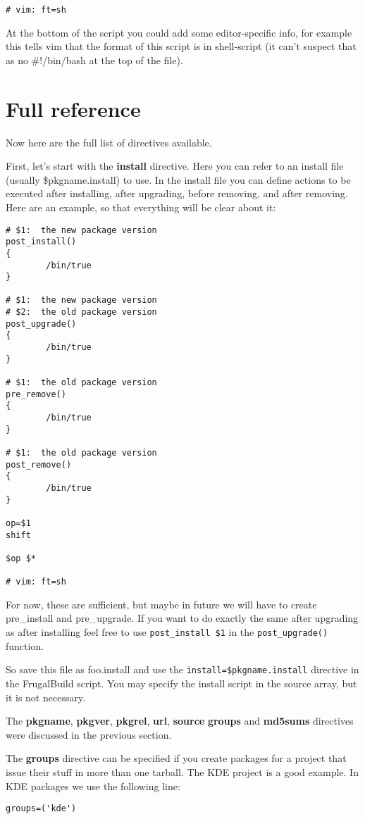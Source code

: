 \begin{verbatim}
# vim: ft=sh
\end{verbatim}

At the bottom of the script you could add some editor-specific info, for example this tells vim that the format of this script is in shell-script (it can't suspect that as no #!/bin/bash at the top of the file).

\section{Full reference}

Now here are the full list of directives available.

First, let's start with the \textbf{install} directive. Here you can refer to an install file (usually \$pkgname.install) to use. In the install file you can define actions to be executed after installing, after upgrading, before removing, and after removing. Here are an example, so that everything will be clear about it:

\begin{verbatim}
# $1:  the new package version
post_install()
{
        /bin/true
}

# $1:  the new package version
# $2:  the old package version
post_upgrade()
{
        /bin/true
}

# $1:  the old package version
pre_remove()
{
        /bin/true
}

# $1:  the old package version
post_remove()
{
        /bin/true
}

op=$1
shift

$op $*

# vim: ft=sh
\end{verbatim}

For now, these are sufficient, but maybe in future we will have to create pre\_install and pre\_upgrade. If you want to do exactly the same after upgrading as after installing feel free to use {\tt post\_install \$1} in the {\tt post\_upgrade()} function.

So save this file as foo.install and use the {\tt install=\$pkgname.install} directive in the FrugalBuild script.
You may specify the install script in the source array, but it is not necessary.

The \textbf{pkgname}, \textbf{pkgver}, \textbf{pkgrel}, \textbf{url}, \textbf{source} \textbf{groups} and \textbf{md5sums} directives were discussed in the previous section.

The \textbf{groups} directive can be specified if you create packages for a project that issue their stuff in more than one tarball. The KDE project is a good example. In KDE packages we use the following line:
\begin{verbatim}
groups=('kde')
\end{verbatim}

